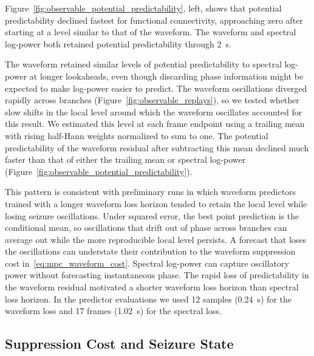 Figure~\ref{fig:observable_potential_predictability}, left, shows that potential predictability declined fastest for functional connectivity, approaching zero after starting at a level similar to that of the waveform.
The waveform and spectral log-power both retained potential predictability through \SI{2}{\second}.

The waveform retained similar levels of potential predictability to spectral log-power at longer lookaheads, even though discarding phase information might be expected to make log-power easier to predict.
The waveform oscillations diverged rapidly across branches (Figure~\ref{fig:observable_replays}), so we tested whether slow shifts in the local level around which the waveform oscillates accounted for this result.
We estimated this level at each frame endpoint using a trailing mean with rising half-Hann weights normalized to sum to one.
The potential predictability of the waveform residual after subtracting this mean declined much faster than that of either the trailing mean or spectral log-power (Figure~\ref{fig:observable_potential_predictability}).

This pattern is consistent with preliminary runs in which waveform predictors trained with a longer waveform loss horizon tended to retain the local level while losing seizure oscillations.
Under squared error, the best point prediction is the conditional mean, so oscillations that drift out of phase across branches can average out while the more reproducible local level persists.
A forecast that loses the oscillations can understate their contribution to the waveform suppression cost in~\eqref{eq:mpc_waveform_cost}.
Spectral log-power can capture oscillatory power without forecasting instantaneous phase.
The rapid loss of predictability in the waveform residual motivated a shorter waveform loss horizon than spectral loss horizon.
In the predictor evaluations we used 12 samples (\SI{0.24}{\second}) for the waveform loss and 17 frames (\SI{1.02}{\second}) for the spectral loss.

\subsection{Suppression Cost and Seizure State}

